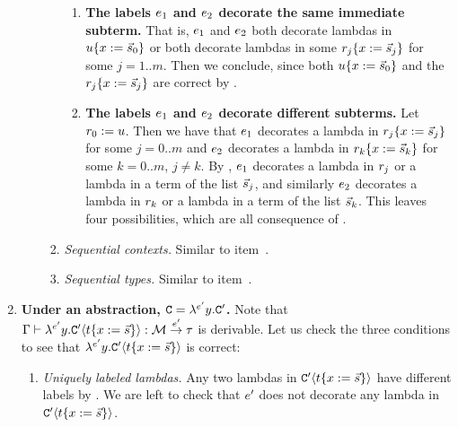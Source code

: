 \begin{enumerate}
\begin{enumerate}
\begin{enumerate}
        \begin{enumerate}
        \item {\bf The labels $e_1$ and $e_2$ decorate the same immediate subterm.}
          That is, $e_1$ and $e_2$ both decorate lambdas in $u\{x := \vec{s}_0\}$
          or both decorate lambdas in some $r_j\{x := \vec{s}_j\}$ for some $j=1..m$.
          Then we conclude, since both $u\{x := \vec{s}_0\}$ and
          the $r_j\{x := \vec{s}_j\}$ are correct by \ih.
        \item {\bf The labels $e_1$ and $e_2$ decorate different subterms.}
          Let $r_0 := u$.
          Then we have that
          $e_1$ decorates a lambda in $r_j\{x := \vec{s}_j\}$ for some $j=0..m$
          and
          $e_2$ decorates a lambda in $r_k\{x := \vec{s}_k\}$ for some $k=0..m$, $j \neq k$.
          By ,
          $e_1$ decorates a lambda in $r_j$ or a lambda in a term of the list $\vec{s}_j$,
          and similarly
          $e_2$ decorates a lambda in $r_k$ or a lambda in a term of the list $\vec{s}_k$.
          This leaves four possibilities, which are all consequence of .
        \end{enumerate}
      \item {\em Sequential contexts.}
        Similar to item~.
      \item {\em Sequential types.}
        Similar to item~.
      \end{enumerate}
    \end{enumerate}
  \item {\bf Under an abstraction, $\mathtt{C} = \lambda^{e'} y. \mathtt{C}'$.}
    Note that $\Gamma \vdash \lambda^{e'} y. \mathtt{C}'\langle t\{x := \vec{s}\}\rangle : \mathcal{M} \overset{e'}{\to} \tau$ is derivable.
    Let us check the three conditions to see that $\lambda^{e'} y. \mathtt{C}'\langle t\{x := \vec{s}\}\rangle$ is correct:
    \begin{enumerate}
    \item {\em Uniquely labeled lambdas.}
      Any two lambdas in $\mathtt{C}'\langle t\{x := \vec{s}\}\rangle$ have different labels by \ih.
      We are left to check that $e'$ does not decorate any lambda in $\mathtt{C}'\langle t\{x := \vec{s}\}\rangle$.

\end{enumerate}
\end{enumerate}

